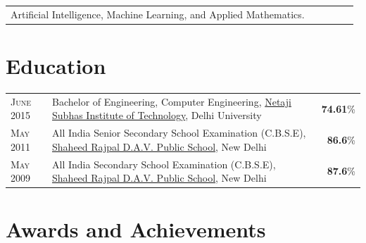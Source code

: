 \documentclass[a4paper]{article} %
\newcommand{\verticalspacing}{-0.25cm}
\newcommand{\projectheadspacing}{6.9cm}
\newcommand{\lineskill}[2]{%
    \begin{tabular}{p{0.98\linewidth}r}
        \small {#2} & \multicolumn{1}{m{ \projectheadspacing{} }}{\raggedleft \textsc{\small #1}}\\
    \end{tabular}
    \vspace{\verticalspacing{}}
    \vspace{-0.0cm} %
}
\begin{document}
\lineskill
    {}
    {Artificial Intelligence, Machine Learning, and Applied Mathematics.}
	

\section{Education}
\def\arraystretch{1.2}
\begin{tabular}{>{\raggedleft}p{1.5cm}p{14.6cm}r}

    \textsc{June 2015} & Bachelor of Engineering, Computer Engineering,
    \href{http://nsit.ac.in/}{Netaji Subhas Institute of Technology}, Delhi University
    & \textbf{74.61}\%\\

    \textsc{May 2011} & All India Senior Secondary School Examination (C.B.S.E),
    \href{http://davdayanandvihar.net/}{Shaheed Rajpal D.A.V. Public School}, New Delhi
    & \textbf{86.6}\%\\

    \textsc{May 2009} & All India Secondary School Examination (C.B.S.E),
    \href{http://davdayanandvihar.net/}{Shaheed Rajpal D.A.V. Public School}, New Delhi
    & \textbf{87.6}\%\\

\end{tabular}
\def\arraystretch{1}



\section{Awards and Achievements}
\end{document}
